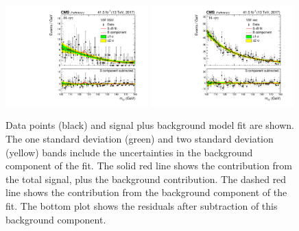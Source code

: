 \begin{figure}[hptb]
  \centering
  \includegraphics[width=0.49\textwidth]{Figures/Appendices/_forAppendix2017ch2_RECO_VBFTOPO_BSM_13TeV.pdf}
  \includegraphics[width=0.49\textwidth]{Figures/Appendices/_forAppendix2017ch2_RECO_VBFTOPO_REST_13TeV.pdf}
  \caption[Signal plus background fits to data.]
  {
    Data points (black) and signal plus background model fit are shown. 
    The one standard deviation (green) and two standard deviation (yellow) bands 
    include the uncertainties in the background component of the fit. 
    The solid red line shows the contribution from the total signal, plus the background contribution. 
    The dashed red line shows the contribution from the background component of the fit. 
    The bottom plot shows the residuals after subtraction of this background component.
  }
\end{figure}
